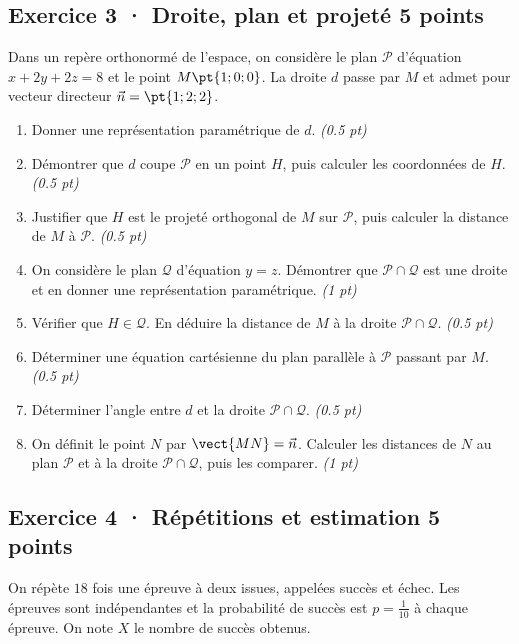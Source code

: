 \subsection*{Exercice 3 · Droite, plan et projeté \hfill 5 points}Dans un repère orthonormé de l'espace, on considère le plan $\mathcal P$ d'équation $x+2y+2z=8$ et le point $M\pt{1;0;0}$. La droite $d$ passe par $M$ et admet pour vecteur directeur $\vec n=\pt{1;2;2}$.

\begin{enumerate}

\item Donner une représentation paramétrique de $d$. \hfill\textit{(\num{0,5} pt)}

\item Démontrer que $d$ coupe $\mathcal P$ en un point $H$, puis calculer les coordonnées de $H$. \hfill\textit{(\num{0,5} pt)}

\item Justifier que $H$ est le projeté orthogonal de $M$ sur $\mathcal P$, puis calculer la distance de $M$ à $\mathcal P$. \hfill\textit{(\num{0,5} pt)}

\item On considère le plan $\mathcal Q$ d'équation $y=z$. Démontrer que $\mathcal P\cap\mathcal Q$ est une droite et en donner une représentation paramétrique. \hfill\textit{(1 pt)}

\item Vérifier que $H\in\mathcal Q$. En déduire la distance de $M$ à la droite $\mathcal P\cap\mathcal Q$. \hfill\textit{(\num{0,5} pt)}

\item Déterminer une équation cartésienne du plan parallèle à $\mathcal P$ passant par $M$. \hfill\textit{(\num{0,5} pt)}

\item Déterminer l'angle entre $d$ et la droite $\mathcal P\cap\mathcal Q$. \hfill\textit{(\num{0,5} pt)}

\item On définit le point $N$ par $\vect{MN}=\vec n$. Calculer les distances de $N$ au plan $\mathcal P$ et à la droite $\mathcal P\cap\mathcal Q$, puis les comparer. \hfill\textit{(1 pt)}

\end{enumerate}

\subsection*{Exercice 4 · Répétitions et estimation \hfill 5 points}On répète $18$ fois une épreuve à deux issues, appelées succès et échec. Les épreuves sont indépendantes et la probabilité de succès est $p=\frac{1}{10}$ à chaque épreuve. On note $X$ le nombre de succès obtenus.

